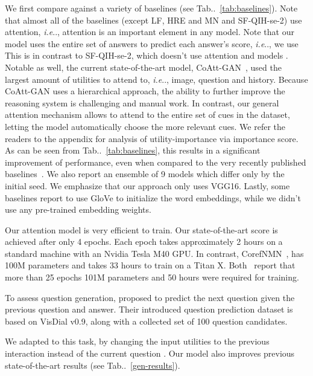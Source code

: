 \documentclass[10pt,twocolumn,letterpaper]{article}
\makeatletter
\def\@onedot{\ifx\@let@token.\else.\null\fi\xspace}
\DeclareRobustCommand\onedot{\futurelet\@let@token\@onedot}
\newcommand{\tabref}[1]{Tab\onedot~\ref{#1}}
\def\ie{\emph{i.e}\onedot} \def\Ie{\emph{I.e}\onedot}
\makeatother
\begin{document}
 We first compare against a variety of baselines (see \tabref{tab:baselines}). Note that almost all of the baselines (except LF, HRE and MN and SF-QIH-se-2) use attention, \ie, attention is an important element in any model. Note that our model uses the entire set of answers to predict each answer's score, \ie, we use  This is in contrast to SF-QIH-se-2, which doesn't use attention and models .
Notable as well, the current state-of-the-art model, CoAtt-GAN~\cite{wu2017you}, used the largest amount of utilities to attend to, \ie, image, question and history. Because CoAtt-GAN  uses a hierarchical  approach, the ability to further improve the reasoning system is  challenging and manual work.  In contrast, our general attention mechanism allows to attend to the entire set of cues  in the dataset,  letting the model automatically choose the more relevant cues.  
We refer the readers to the appendix for analysis of utility-importance via importance score. As can be seen from \tabref{tab:baselines}, this results in a significant improvement of performance, even when compared to the very recently published baselines~\cite{jain2018two, wu2017you, kottur2018visual}. 
We also report an ensemble of 9 models which differ only by the initial seed. We emphasize that our approach only uses VGG16. Lastly, some baselines report to use GloVe to initialize the word embeddings, while we didn't use any pre-trained embedding weights. 

Our attention model is very efficient to train. 
Our state-of-the-art score is achieved after only 4 epochs. Each epoch takes approximately 2 hours on a standard machine with an Nvidia Tesla M40 GPU. In contrast, CorefNMN~\cite{kottur2018visual}, has 100M parameters and takes 33 hours to train on a Titan X. Both~\cite{lu2017best,wu2017you}  report that more than 25 epochs 101M parameters and 50 hours were required for training. 

  To assess question generation,  \cite{jain2018two} proposed to predict the next question given the previous  question and answer. Their introduced question prediction dataset is based on VisDial v0.9, along with a collected set of 100 question candidates. 

 We adapted to this task, by changing the input utilities to the previous interaction  instead of the current question . Our model also improves  previous state-of-the-art results (see \tabref{gen-results}). 
\end{document}
